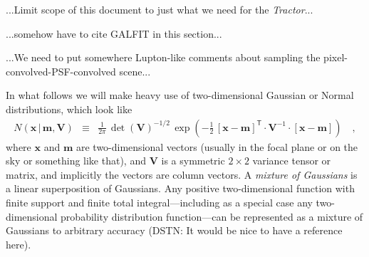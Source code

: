 \documentclass[12pt,pdftex,preprint]{aastex}
\newcommand{\project}[1]{\textsl{#1}}
\newcommand{\tractor}{\project{Tractor}}
\newcommand{\tmatrix}[1]{\boldsymbol{#1}}
\newcommand{\inverse}[1]{{#1}^{-1}}
\newcommand{\transpose}[1]{{#1}^{\mathsf T}}
\newcommand{\tvector}[1]{\boldsymbol{#1}}
\newcommand{\pos}{\tvector{x}}
\newcommand{\mean}{\tvector{m}}
\newcommand{\var}{\tmatrix{V}\!}
\newcommand{\normal}{N}
\newcommand{\given}{\,|\,}
\begin{document}
...Limit scope of this document to just what we need for the
\tractor...

...somehow have to cite GALFIT \citep{galfit} in this section...

...We need to put somewhere Lupton-like comments about sampling the
pixel-convolved-PSF-convolved scene...

In what follows we will make heavy use of two-dimensional Gaussian or
Normal distributions, which look like
\begin{eqnarray}\displaystyle
\normal(\pos\given\mean,\var) &\equiv& \frac{1}{2\pi}\,\det(\var)^{-1/2}\,\exp(-\frac{1}{2}\,\transpose{[\pos-\mean]}\cdot\inverse{\var}\cdot[\pos-\mean])
\quad ,
\end{eqnarray}
where $\pos$ and $\mean$ are two-dimensional vectors (usually in the
focal plane or on the sky or something like that), and $\var$ is a
symmetric $2\times 2$ variance tensor or matrix, and implicitly the
vectors are column vectors.  A \emph{mixture of Gaussians} is a linear
superposition of Gaussians.  Any positive two-dimensional function
with finite support and finite total integral---including as a special
case any two-dimensional probability distribution function---can be
represented as a mixture of Gaussians to arbitrary accuracy (DSTN: It
would be nice to have a reference here).
\end{document}
